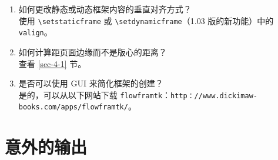\documentclass[a4paper]{book}%
\newcommand{\ffdpath}[1]{\texttt{#1}}
\newcommand{\filename}[1]{\texttt{#1}}
\newcommand{\cmd}[1]{\texttt{#1}}
\begin{document}
\begin{enumerate}
    \item 如何更改静态或动态框架内容的垂直对齐方式？\\ 使用 \verb|\setstaticframe| 或 \verb|\setdynamicframe|（1.03 版的新功能）中的 \cmd{valign}。
    \item 如何计算距页面边缘而不是版心的距离？\\ 查看 \ref{sec-4-1} 节。\label{page-que-10}\label{que-10}
    \item 是否可以使用 GUI 来简化框架的创建？\\ 是的，可以从以下网站下载 \filename{flowframtk}：\ffdpath{http：//www.dickimaw-books.com/apps/flowframtk/}。
\end{enumerate}
\section{意外的输出}\label{sec-8-2}%
\end{document}
